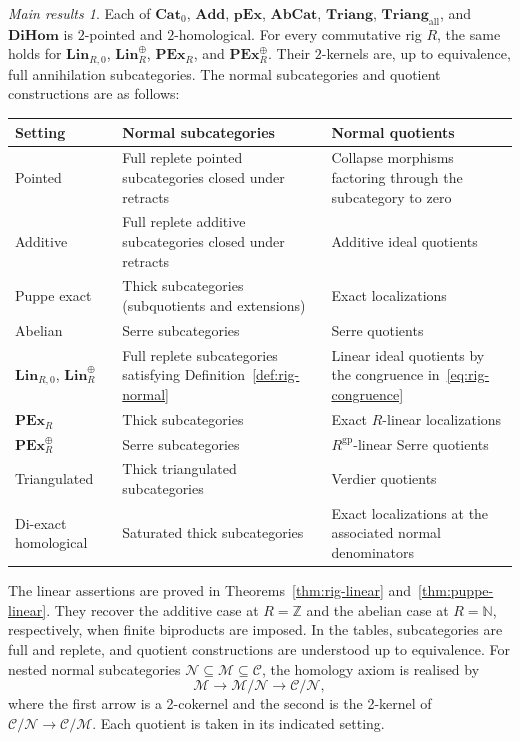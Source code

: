 \documentclass[11pt,reqno,a4paper]{amsart}
\theoremstyle{definition}
\theoremstyle{remark}
\newcommand{\C}{\mathcal{C}}
\newcommand{\M}{\mathcal{M}}
\newcommand{\N}{\mathcal{N}}
\newcommand{\0}{\mathbf{0}}
\renewcommand{\1}{\mathbf{1}}
\newcommand{\Triang}{\mathbf{Triang}}
\newcommand{\AbCat}{\mathbf{AbCat}}
\newcommand{\pExact}{\mathbf{pEx}}
\newtheorem*{maintheorem}{Main results}
\newcommand{\Pt}{\mathbf{Cat}_{0}}
\newcommand{\Add}{\mathbf{Add}}
\newcommand{\Tri}{\Triang}
\newcommand{\TriAll}{\mathbf{Triang}_{\mathrm{all}}}
\newcommand{\DiHom}{\mathbf{DiHom}}
\begin{document}
\begin{maintheorem}\label{thm:main}
Each of $\Pt$, $\Add$, $\pExact$, $\AbCat$, $\Tri$, $\TriAll$,
and $\DiHom$ is $2$-pointed and $2$-homological. For every commutative
rig $R$, the same holds for $\mathbf{Lin}_{R,0}$,
$\mathbf{Lin}_{R}^{\oplus}$, $\mathbf{PEx}_{R}$, and
$\mathbf{PEx}_{R}^{\oplus}$. Their $2$-kernels are, up to equivalence,
full annihilation subcategories. The normal subcategories and quotient
constructions are as follows:
\begin{center}
\small
\begin{tabularx}{\textwidth}{@{}>{\raggedright\arraybackslash}p{30mm}>{\raggedright\arraybackslash}X>{\raggedright\arraybackslash}X@{}}
\toprule
Setting & Normal subcategories & Normal quotients\\
\midrule
Pointed & Full replete pointed subcategories closed under retracts & Collapse morphisms factoring through the subcategory to zero\\[3pt]
Additive & Full replete additive subcategories closed under retracts & Additive ideal quotients\\[3pt]
Puppe exact & Thick subcategories (subquotients and extensions) & Exact localizations\\[3pt]
Abelian & Serre subcategories & Serre quotients\\[3pt]
$\mathbf{Lin}_{R,0}$, $\mathbf{Lin}_{R}^{\oplus}$ & Full replete subcategories satisfying Definition~\ref{def:rig-normal} & Linear ideal quotients by the congruence in~\eqref{eq:rig-congruence}\\[3pt]
$\mathbf{PEx}_{R}$ & Thick subcategories & Exact $R$-linear localizations\\[3pt]
$\mathbf{PEx}_{R}^{\oplus}$ & Serre subcategories & $R^{\mathrm{gp}}$-linear Serre quotients\\[3pt]
Triangulated & Thick triangulated subcategories & Verdier quotients\\[3pt]
Di-exact homological & Saturated thick subcategories & Exact localizations at the associated normal denominators\\
\bottomrule
\end{tabularx}
\end{center}
The linear assertions are proved in Theorems~\ref{thm:rig-linear}
and~\ref{thm:puppe-linear}. They recover the additive case at
$R=\mathbb Z$ and the abelian case at $R=\mathbb N$, respectively,
when finite biproducts are imposed. In the tables, subcategories are
full and replete, and quotient constructions are understood up to
equivalence.
For nested normal subcategories $\N\subseteq\M\subseteq\C$, the
homology axiom is realised by
\[
 \M\longrightarrow\M/\N\longrightarrow\C/\N,
\]
where the first arrow is a 2-cokernel and the second is the 2-kernel of
$\C/\N\to\C/\M$. Each quotient is taken in its indicated setting.
\end{maintheorem}
\end{document}
